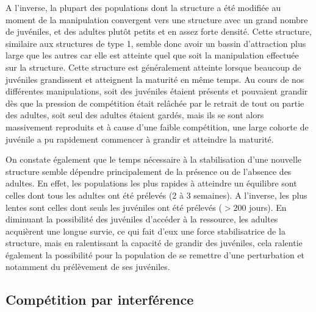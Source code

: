 A l'inverse, la plupart des populations dont la structure a été modifiée au
moment de la manipulation convergent vers une structure avec un grand nombre de
juvéniles, et des adultes plutôt petits et en assez forte densité. Cette
structure, similaire aux structures de type 1, semble donc avoir un bassin
d'attraction plus large que les autres car elle est atteinte quel que soit la
manipulation effectuée sur la structure. Cette structure est généralement
atteinte lorsque beaucoup de juvéniles grandissent et atteignent la maturité en
même temps. Au cours de nos différentes manipulations, soit des juvéniles
étaient présents et pouvaient grandir dès que la pression de compétition était
relâchée par le retrait de tout ou partie des adultes, soit seul des adultes
étaient gardés, mais ils se sont alors massivement reproduits et à cause d'une
faible compétition, une large cohorte de juvénile a pu rapidement commencer à
grandir et atteindre la maturité. 

On constate également que le temps nécessaire à la stabilisation d'une nouvelle
structure semble dépendre principalement de la présence ou de l'absence des
adultes. En effet, les populations les plus rapides à atteindre un équilibre
sont celles dont tous les adultes ont été prélevés (2 à 3 semaines).
A l'inverse, les plus lentes sont celles dont seuls les juvéniles ont été
prélevés ($>200$ jours). En diminuant la possibilité des juvéniles d'accéder à
la ressource, les adultes acquièrent une longue survie, ce qui fait d'eux une
force stabilisatrice de la structure, mais en ralentissant la capacité de
grandir des juvéniles, cela ralentie également la possibilité pour la population
de se remettre d'une perturbation et notamment du prélèvement de ses juvéniles.

\subsection{Compétition par interférence}

